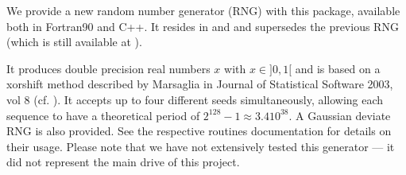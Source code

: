 \documentclass[12pt,twoside]{article}
\begin{document}
We provide a new random number generator (RNG) with this package, available both
in Fortran90 and C++. 
It resides in 
and 
and supersedes the previous RNG (which is still available at 
). 

It produces double precision real numbers $x$ with $x\in]0,1[$ and is based 
on a xorshift method described by Marsaglia in 
Journal of Statistical Software 2003, vol 8
(cf. ).
It accepts up to four different seeds simultaneously, allowing each sequence to
have a
theoretical period of $2^{128}-1 \approx 3.4 10^{38}$. A Gaussian deviate RNG is
also provided. See the respective routines documentation for details on their usage.
Please note that we have not extensively tested this generator 
--- it did not represent the main drive of this project.



\newpage

\end{document}
